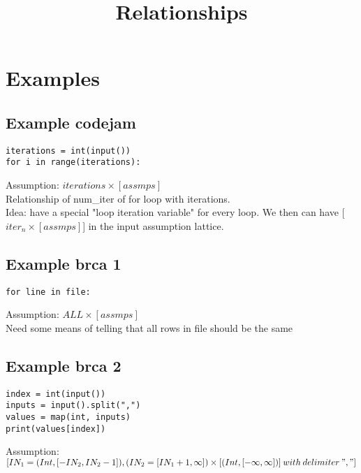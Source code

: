 \documentclass[11pt]{article}
\begin{document}
\title{Relationships}

\maketitle


\section{Examples}


\subsection{Example codejam}
\begin{lstlisting}
iterations = int(input())
for i in range(iterations):
\end{lstlisting}


Assumption: $iterations \times [assmps]$\\

Relationship of num\_iter of for loop with iterations. \\
Idea: have a special "loop iteration variable" for every loop. We then can have [$iter_n\times[assmps]$] in the input assumption lattice. \\



\subsection{Example brca 1}
\begin{lstlisting}
for line in file:
\end{lstlisting}


Assumption: $ALL \times [assmps]$\\

Need some means of telling that all rows in file should be the same\\


\subsection{Example brca 2}
\begin{lstlisting}
index = int(input())
inputs = input().split(",")
values = map(int, inputs)
print(values[index])
\end{lstlisting}


Assumption: $[IN_1 = (Int, [-IN_2, IN_2-1]), (IN_2 = [IN_1+1, \infty]) \times [(Int, [-\infty, \infty])]\:with\:delimiter\:","]$\\
\end{document}
